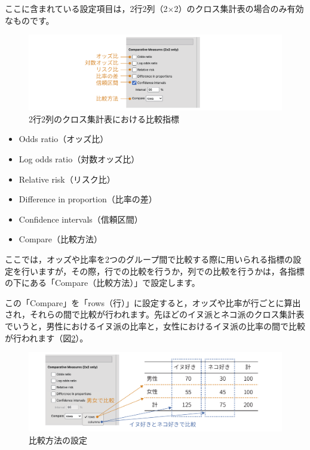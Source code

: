 \documentclass[
  12pt,
  a5jpaper,
  lualatex, ja=standard]{bxjsbook}
\providecommand{\tightlist}{%
  \setlength{\itemsep}{0pt}\setlength{\parskip}{0pt}}
\newenvironment{jmvsettings}{%
	\begin{center}%
	\begin{tcolorbox}[%
		title=設定項目,
		colframe=gmoji,
		colbacktitle=gmoji,
		colback=gmoji!2!white,
		breakable,
		width=.9\textwidth,
		]\small\addtolength{\leftmargini}{-3\labelsep}%
	}%
	{\end{tcolorbox}\end{center}}
\begin{document}
ここに含まれている設定項目は，2行2列（2×2）のクロス集計表の場合のみ有効なものです。

\begin{figure}[!ht]

{\centering \includegraphics[width=1\linewidth]{images/frequencies/chisq-comparative} 

}

\caption{2行2列のクロス集計表における比較指標}\label{fig:frequencies-chisq-comparative}
\end{figure}

\begin{jmvsettings}

\begin{itemize}
\tightlist
\item
  Odds ratio（オッズ比）
\item
  Log odds ratio（対数オッズ比）
\item
  Relative risk（リスク比）
\item
  Difference in proportion（比率の差）
\item
  Confidence intervals（信頼区間）
\item
  Compare（比較方法）
\end{itemize}

\end{jmvsettings}

ここでは，オッズや比率を2つのグループ間で比較する際に用いられる指標の設定を行いますが，その際，行での比較を行うか，列での比較を行うかは，各指標の下にある「Compare（比較方法）」で設定します。

この「Compare」を「rows（行）」に設定すると，オッズや比率が行ごとに算出され，それらの間で比較が行われます。先ほどのイヌ派とネコ派のクロス集計表でいうと，男性におけるイヌ派の比率と，女性におけるイヌ派の比率の間で比較が行われます（図\ref{fig:frequencies-chisq-compare-setting}）。

\begin{figure}[!ht]

{\centering \includegraphics[width=1\linewidth]{images/frequencies/chisq-compare-setting} 

}

\caption{比較方法の設定}\label{fig:frequencies-chisq-compare-setting}
\end{figure}
\end{document}
